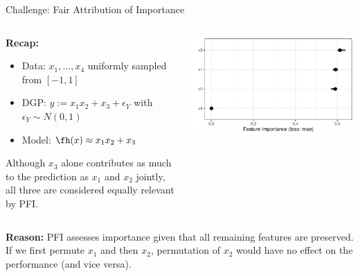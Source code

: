 \documentclass[11pt,compress,t,notes=noshow, aspectratio=169, xcolor=table]{beamer}
\begin{document}
\begin{frame}{Challenge: Fair Attribution of Importance}
\begin{columns}[T, totalwidth=\textwidth]
\begin{column}{0.54\textwidth}
\textbf{Recap:} 
\begin{itemize}
\item Data: $x_1, \dots, x_4$ uniformly sampled from $[-1, 1]$ 
\item DGP: $y:= x_1 x_2 + x_3 + \epsilon_Y$ with $\epsilon_Y \sim N(0, 1)$
\item Model: $\fh(x) \approx x_1 x_2 + x_3$
\end{itemize}

\lz

Although $x_3$ alone contributes as much to the prediction as $x_1$ and $x_2$ jointly, all three are considered equally relevant by PFI.
\end{column}
\begin{column}{0.45\textwidth}
\centering
  \includegraphics[width=\linewidth]{figure_man/pfi_interactions.pdf}
\end{column}
\end{columns}
\lz
\textbf{Reason:} PFI assesses importance given that all remaining features are preserved. If we first permute $x_1$ and then $x_2$, permutation of $x_2$ would have no effect on the performance (and vice versa).
\end{frame}
\end{document}
